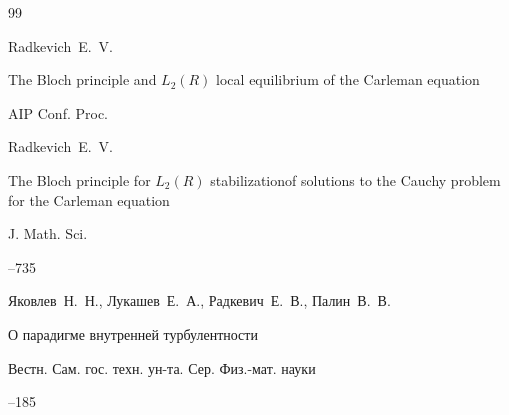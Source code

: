 \begin{thebibliography}{99}

\by Radkevich~E.~V.

\paper The Bloch principle and $L_2 (R)$ local equilibrium of the Carleman equation

\jour AIP Conf. Proc.


\issue 












\by Radkevich~E.~V.

\paper The Bloch principle for $L_2 (R)$ stabilizationof solutions to the Cauchy problem for the Carleman equation

\jour J. Math. Sci.





–735 





\by Яковлев~Н.~Н., Лукашев~Е.~А., Радкевич~Е.~В., Палин~В.~В. 

\paper О парадигме внутренней турбулентности

\jour Вестн. Сам. гос. техн. ун-та. Сер. Физ.-мат. науки




--185








\end{thebibliography}
